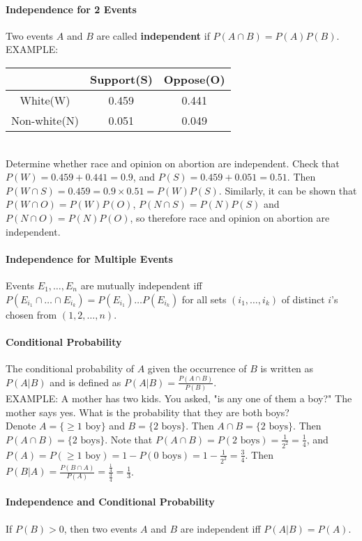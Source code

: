 \documentclass[10pt,letter]{article}
\begin{document}
\paragraph{Independence for 2 Events}
Two events $A$ and $B$ are called \textbf{independent} if $P(A\cap B)=P(A)P(B)$. \pagebreak\\ 
EXAMPLE: \begin{tabular}{ |c|c|c| }\hline&Support(S)&Oppose(O)\\\hline White(W)&0.459&0.441\\Non-white(N)&0.051&0.049\\\hline\end{tabular}\\ 
Determine whether race and opinion on abortion are independent. Check that $P(W)=0.459+0.441=0.9$, and $P(S)=0.459+0.051=0.51$. Then $P(W\cap S)=0.459=0.9\times0.51=P(W)P(S)$. Similarly, it can be shown that $P(W\cap O)=P(W)P(O)$, $P(N\cap S)=P(N)P(S)$ and $P(N\cap O)=P(N)P(O)$, so therefore race and opinion on abortion are independent.  

\paragraph{Independence for Multiple Events}
Events $E_1,\ldots,E_n$ are mutually independent iff $P(E_{i_1}\cap\ldots\cap E_{i_k})=P(E_{i_1})\ldots P(E_{i_k})$ for all sets $(i_1,\ldots,i_k)$ of distinct $i$'s chosen from $(1,2,\ldots,n)$. 

\paragraph{Conditional Probability} 
The conditional probability of $A$ given the occurrence of $B$ is written as $P(A|B)$ and is defined as $P(A|B)=\frac{P(A\cap B)}{P(B)}$.  \\ 
EXAMPLE: A mother has two kids. You asked, "is any one of them a boy?" The mother says yes. What is the probability that they are both boys? \\ 
Denote $A=\{\geq1 \text{ boy}\}$ and $B=\{2 \text{ boys}\}$. Then $A\cap B=\{2 \text{ boys}\}$. Then $P(A\cap B)=\{2 \text{ boys}\}$. Note that $P(A\cap B)=P(2\text{ boys})=\frac{1}{2^2}=\frac{1}{4}$, and $P(A)=P(\geq1\text{ boy})=1-P(0\text{ boys})=1-\frac{1}{2^2}=\frac{3}{4}$. Then $P(B|A)=\frac{P(B\cap A)}{P(A)}=\frac{\frac{1}{4}}{\frac{3}{4}}=\frac{1}{3}$. \\ 

\paragraph{Independence and Conditional Probability} 
If $P(B)>0$, then two events $A$ and $B$ are independent iff $P(A|B)=P(A)$. 
\end{document}
